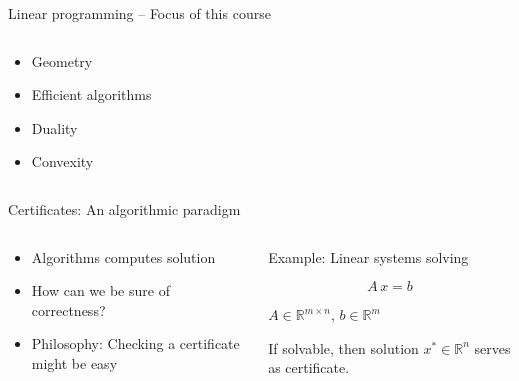 \begin{frame}{Linear programming --  Focus of this course}

    \begin{columns}
      \begin{column}{.5\textwidth}
        \begin{itemize}
        \item Geometry
        \item Efficient algorithms
        \item Duality
        \item Convexity 
        \end{itemize}
        
      \end{column}
      \begin{column}{.5\textwidth}

      \end{column}       
    \end{columns}
  \end{frame}  
   
\begin{frame}{Certificates: An algorithmic paradigm}

    \begin{columns}
      \begin{column}{.5\textwidth}
        \begin{itemize}
        \item Algorithms computes solution
        \item How can we be sure of correctness?
        \item Philosophy: Checking a certificate might be easy 
        \end{itemize}
      \end{column}
      \begin{column}{.5\textwidth}
        Example: Linear systems solving 

        \begin{equation}
          \label{eq:1}
          A \, x =b 
        \end{equation}
        
        $A ∈ℝ^{m ×n}$, $b ∈ ℝ^m$ 

        \bigskip

        \medskip 
        If solvable, then solution $x^* ∈ ℝ^n$ serves as certificate.
        
      \end{column}
      
    \end{columns}
  \end{frame}  


